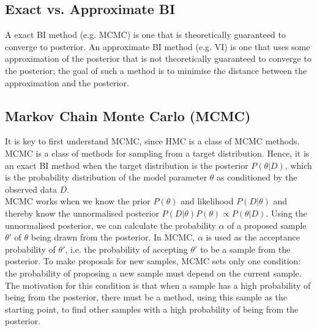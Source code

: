 \documentclass[conference]{IEEEtran}
\begin{document}
\subsection{Exact vs. Approximate BI}
A exact BI method (e.g. MCMC) is one that is theoretically guaranteed to converge to posterior. An approximate BI method (e.g. VI) is one that uses some approximation of the posterior that is not theoretically guaranteed to converge to the posterior; the goal of such a method is to minimise the distance between the approximation and the posterior.

\subsection{Markov Chain Monte Carlo (MCMC)}
It is key to first understand MCMC, since HMC is a class of MCMC methods. MCMC is a class of methods for sampling from a target distribution. Hence, it is an exact BI method when the target distribution is the posterior $P(\theta|D)$, which is the probability distribution of the model parameter $\theta$ as conditioned by the observed data $D$.\\

MCMC works when we know the prior $P(\theta)$ and likelihood $P(D|\theta)$ and thereby know the unnormalised posterior $P(D|\theta)P(\theta) \propto P(\theta|D)$. Using the unnormalised posterior, we can calculate the probability $\alpha$ of a proposed sample $\theta'$ of $\theta$ being drawn from the posterior. In MCMC, $\alpha$ is used as the acceptance probability of $\theta'$, i.e. the probability of accepting $\theta'$ to be a sample from the posterior. To make proposals for new samples, MCMC sets only one condition: the probability of proposing a new sample must depend on the current sample. The motivation for this condition is that when a sample has a high probability of being from the posterior, there must be a method, using this sample as the starting point, to find other samples with a high probability of being from the posterior.\\
\end{document}
